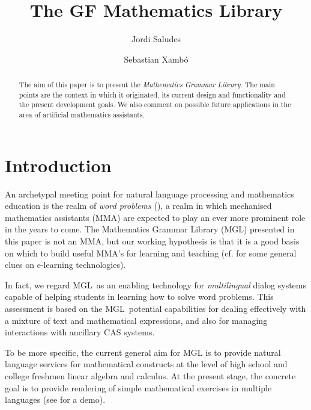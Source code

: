 \documentclass[adraft,copyright,creativecommons]{eptcs}
\title{The GF Mathematics Library}
\author{Jordi Saludes
\institute{Universitat Polit\`ecnica de Catalunya}
\institute{Sistemes Avan\c cats de Control}
\email{jordi.saludes@upc.edu}
\and
Sebastian Xamb\'o
\institute{Universitat Polit\`ecnica de Catalunya}
\institute{MA2, Edifici OMEGA, Barcelona (Spain)}
\email{\quad sebastia.xambo@upc.edu}
}
\begin{document}
\maketitle
\newcommand{\molto}{\textsc{mOlto}}
\newcommand{\webalt}{\textsc{WebALT}}
\newcommand{\openmath}{\textsc{OpenMath}}
\newcommand{\CD}{\textsc{CD}}
\newcommand{\OM}{\textsc{OM}}
\newcommand{\MGL}{\textsc{MGL}}
\newcommand{\MMA}{\textsc{MMA}}
\newcommand{\CAS}{\textsc{CAS}}
\newcommand{\GF}{\textsc{GF}}

\newcommand{\Nat}{\texttt{Nat}}
\newcommand{\Prop}{\texttt{Prop}}



\begin{abstract}
The aim of this paper is to present
the \emph{Mathematics Grammar Library}.
The main points are
the context in which it originated,
its current design and functionality
and the present development goals.
We also comment on possible future applications
in the area of artificial mathematics assistants.
\end{abstract}





\section{Introduction}

An archetypal meeting point for natural language processing and mathematics
education is the realm of \emph{word problems}
(\cite{wikipedia-wordproblem, Verschaffel-Greer-DeCorte-2000}), a realm in
which mechanised mathematics assistants (\MMA) are expected to play an ever
more prominent role in the years to come.  The Mathematics Grammar Library
(\MGL) presented in this paper is not an \MMA, but our working hypothesis
is that it is a good basis on which to build useful \MMA's for learning and
teaching (cf. \cite{E-LearningMathematics, AutonomousLearners} for some
general clues on e-learning technologies).

In fact, we regard \MGL\ as an enabling technology for \emph{multilingual}
dialog systems capable of helping students in learning how to solve word
problems.  This assessment is based on the \MGL\ potential capabilities
for dealing effectively with a mixture of text and mathematical
expressions, and also for managing interactions with ancillary \CAS{}
systems.

To be more specific, the current general aim for MGL is to provide natural
language services for mathematical constructs at the level of high school
and college freshmen linear algebra and calculus.  At the present stage,
the concrete goal is to provide rendering of simple mathematical exercises
in multiple languages (see \cite{MathBar} for a demo).
\end{document}
